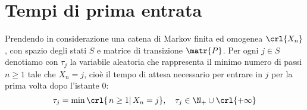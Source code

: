 \documentclass[\main/main.tex]{subfiles}
\begin{document}
\section{Tempi di prima entrata}
\begin{definition}
  Prendendo in considerazione una catena di Markov finita ed omogenea \(\crl{X_n}\), con spazio degli stati \(S\) e matrice di transizione \(\matr{P}\). Per ogni \(j \in S\) denotiamo con \(\tau_j\) la variabile aleatoria che rappresenta il minimo numero di passi \(n\geq 1\) tale che \(X_n = j\), cioè il tempo di attesa necessario per entrare in \(j\) per la prima volta dopo l'istante \(0\):
  \[
    \tau_j = \min\crl{\left. n\geq 1 \right\rvert X_n = j}, \quad \tau_j \in \N_+ \cup \crl{+\infty}
  \]
\end{definition}
\end{document}

